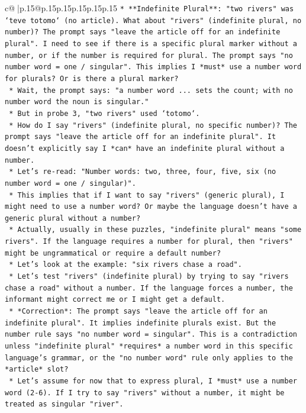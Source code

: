 \documentclass{article}
\begin{document}
{\begin{supertabular}{c@{$\;$}|p{.15\linewidth}@{}p{.15\linewidth}p{.15\linewidth}p{.15\linewidth}p{.15\linewidth}p{.15\linewidth}}
{{{\texttt{*   **Indefinite Plural**: "two rivers" was `teve totomo` (no article). What about "rivers" (indefinite plural, no number)? The prompt says "leave the article off for an indefinite plural". I need to see if there is a specific plural marker without a number, or if the number is required for plural. The prompt says "no number word = one / singular". This implies I *must* use a number word for plurals? Or is there a plural marker?} \\
\texttt{    *   Wait, the prompt says: "a number word ... sets the count; with no number word the noun is singular."} \\
\texttt{    *   But in probe 3, "two rivers" used `totomo`.} \\
\texttt{    *   How do I say "rivers" (indefinite plural, no specific number)? The prompt says "leave the article off for an indefinite plural". It doesn't explicitly say I *can* have an indefinite plural without a number.} \\
\texttt{    *   Let's re{-}read: "Number words: two, three, four, five, six (no number word = one / singular)".} \\
\texttt{    *   This implies that if I want to say "rivers" (generic plural), I might need to use a number word? Or maybe the language doesn't have a generic plural without a number?} \\
\texttt{    *   Actually, usually in these puzzles, "indefinite plural" means "some rivers". If the language requires a number for plural, then "rivers" might be ungrammatical or require a default number?} \\
\texttt{    *   Let's look at the example: "six rivers chase a road".} \\
\texttt{    *   Let's test "rivers" (indefinite plural) by trying to say "rivers chase a road" without a number. If the language forces a number, the informant might correct me or I might get a default.} \\
\texttt{    *   *Correction*: The prompt says "leave the article off for an indefinite plural". It implies indefinite plurals exist. But the number rule says "no number word = singular". This is a contradiction unless "indefinite plural" *requires* a number word in this specific language's grammar, or the "no number word" rule only applies to the *article* slot?} \\
\texttt{    *   Let's assume for now that to express plural, I *must* use a number word (2{-}6). If I try to say "rivers" without a number, it might be treated as singular "river".} \\
}}}
\end{supertabular}}
\end{document}
